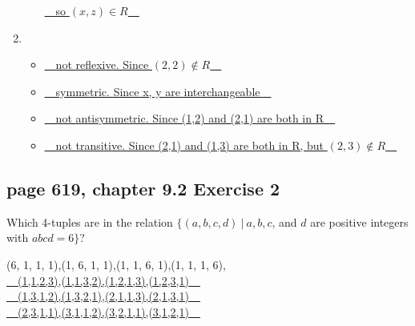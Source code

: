 \documentclass[sigconf]{acmart}
\begin{document}
\begin{enumerate}[label=(\alph*)]
\begin{itemize}
        \underline{~~so $(x,z) \in R$~~}
    \end{itemize}
    \item
    \begin{itemize}
        \item \underline{~~not reflexive. Since $(2,2) \notin R$~~}
        \item \underline{~~symmetric. Since x, y are interchangeable~~}
        \item \underline{~~not antisymmetric. Since (1,2) and (2,1) are both in R~~}
        \item \underline{~~not transitive. Since (2,1) and (1,3) are both in R, but $(2,3) \notin R$~~}
    \end{itemize}
\end{enumerate}

\subsection{page 619, chapter 9.2 Exercise 2}
\begin{shaded}
    Which 4-tuples are in the relation $\{ (a, b, c, d)~\vert~a, b, c$, and $d$ are positive integers with $abcd = 6 \}$?
\end{shaded}
(6, 1, 1, 1),(1, 6, 1, 1),(1, 1, 6, 1),(1, 1, 1, 6),\\
\underline{~~(1,1,2,3),(1,1,3,2),(1,2,1,3),(1,2,3,1)~~}\\
\underline{~~(1,3,1,2),(1,3,2,1),(2,1,1,3),(2,1,3,1)~~}\\
\underline{~~(2,3,1,1),(3,1,1,2),(3,2,1,1),(3,1,2,1)~~}
\end{document}

